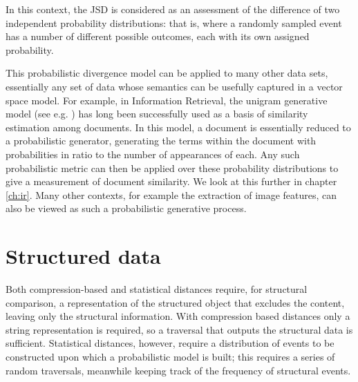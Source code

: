 In this context, the JSD is considered as an assessment of the difference of two independent probability distributions: that is, where a randomly sampled event has a number of different possible outcomes, each with its own assigned probability.

This probabilistic divergence model can be applied to many other data sets, essentially any set of data whose semantics can be usefully captured in a vector space model. For example, in Information Retrieval, the unigram generative model (see e.g. \cite{manning:book,rijsbergen:1979}) has long been successfully used as a basis of similarity estimation among documents. In this model, a document is essentially reduced to a probabilistic generator, generating the terms within the document with probabilities in ratio to the number of appearances of each. Any such probabilistic metric can then be applied over these probability distributions to give a measurement of document similarity.  We look at this further in chapter \ref{ch:ir}.  Many other contexts, for example the extraction of image features, can also be viewed as such a probabilistic generative process.
\section{Structured data}
Both compression-based and statistical distances require, for structural comparison, a representation of the structured object that excludes the content, leaving only the structural information.  With compression based distances only a string representation is required, so a traversal that outputs the structural data is sufficient.  Statistical distances, however, require a distribution of events to be constructed upon which a probabilistic model is built; this requires a series of random traversals, meanwhile keeping track of the frequency of structural events.

